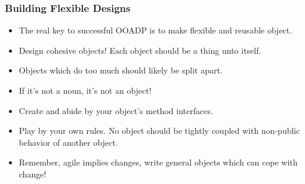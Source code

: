 \documentclass{beamer}
\begin{document}
\begin{frame}
    \frametitle{Building Flexible Designs}
    \begin{itemize}[<+->]
        \item The real key to successful OOADP is to make flexible and reusable
            object.
        \item Design cohesive objects!  Each object should be a thing unto itself.
        \item Objects which do too much should likely be split apart.
        \item If it's not a noun, it's not an object!
        \item Create and abide by your object's method interfaces.
        \item Play by your own rules.  No object should be tightly coupled
            with non-public behavior of another object.
        \item Remember, agile implies changes, write general objects which can cope
            with change!
    \end{itemize}
\end{frame}
\end{document}
